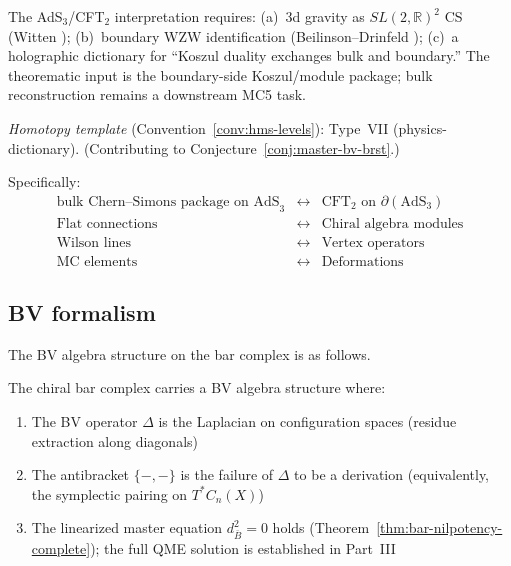 \begin{remark}[Scope]
The AdS$_3$/CFT$_2$ interpretation requires: (a)~3d gravity as $SL(2,\mathbb{R})^2$ CS (Witten \cite{Wit89}); (b)~boundary WZW identification (Beilinson--Drinfeld \cite{BD04}); (c)~a holographic dictionary for ``Koszul duality exchanges bulk and boundary.''  The theorematic input is the boundary-side Koszul/module package; bulk reconstruction remains a downstream MC5 task.

\emph{Homotopy template} (Convention~\ref{conv:hms-levels}): Type~VII (physics-dictionary).  (Contributing to Conjecture~\ref{conj:master-bv-brst}.)
\end{remark}

Specifically:
\[
\begin{array}{ccc}
\text{bulk Chern--Simons package on AdS}_3 & \longleftrightarrow & \text{CFT}_2 \text{ on } \partial(\text{AdS}_3) \\
\text{Flat connections} & \longleftrightarrow & \text{Chiral algebra modules} \\
\text{Wilson lines} & \longleftrightarrow & \text{Vertex operators} \\
\text{MC elements} & \longleftrightarrow & \text{Deformations}
\end{array}
\]

\subsection{BV formalism}

The BV algebra structure on the bar complex is as follows.

\begin{theorem}
\label{thm:bv-structure-bar}
The chiral bar complex carries a BV algebra structure where:
\begin{enumerate}
\item The BV operator $\Delta$ is the Laplacian on configuration spaces
(residue extraction along diagonals)
\item The antibracket $\{-,-\}$ is the failure of $\Delta$ to be a
derivation (equivalently, the symplectic pairing on $T^*C_n(X)$)
\item The linearized master equation $d_{\bar{B}}^2 = 0$ holds
(Theorem~\ref{thm:bar-nilpotency-complete}); the full QME solution
is established in Part~III
\end{enumerate}
\end{theorem}

